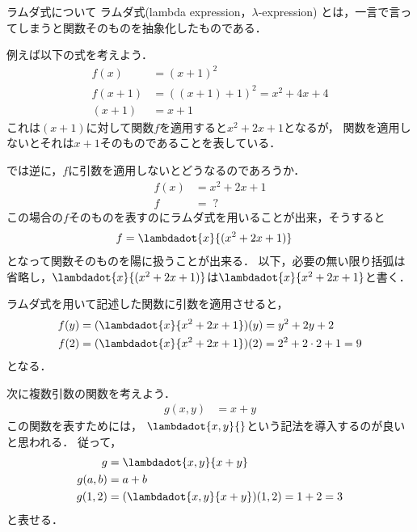 \documentclass[a4paper,titlepage,report]{jsbook}
\begin{document}
\begin{resbonsiblesection}{ラムダ式について}{\sakamoto}\label{sc:about-lambda-expression}
ラムダ式(lambda expression，$\lambda$-expression) とは，一言で言ってしまうと関数そのものを抽象化したものである．

例えば以下の式を考えよう．
\begin{align}
f(x) &= (x + 1)^2\\
f(x + 1) &= {\left((x + 1) + 1\right)}^2 = x^2 + 4x + 4\\
(x + 1) &= x + 1
\end{align}
これは$(x + 1)$に対して関数$f$を適用すると$x^2 + 2x + 1$となるが，
関数を適用しないとそれは$x + 1$そのものであることを表している．

では逆に，$f$に引数を適用しないとどうなるのであろうか．
\begin{align}
f(x) &= x^2 + 2x + 1\\
f    &= \;?
\end{align}
この場合の$f$そのものを表すのにラムダ式を用いることが出来，そうすると
\begin{align}
f &= \lambdadot{x}{(x^2 + 2x + 1)}
\end{align}
となって関数そのものを陽に扱うことが出来る．
以下，必要の無い限り括弧は省略し，$\lambdadot{x}{(x^2 + 2x + 1)}$は$\lambdadot{x}{x^2 + 2x + 1}$と書く．

ラムダ式を用いて記述した関数に引数を適用させると，
\begin{align}
f(y) &= (\lambdadot{x}{x^2 + 2x + 1})(y) = y^2 + 2y + 2 \\
f(2) &= (\lambdadot{x}{x^2 + 2x + 1})(2) = 2^2 + 2\cdot 2 + 1 = 9
\end{align}
となる．

次に複数引数の関数を考えよう．
\begin{align}
g(x, y) &= x + y
\end{align}
この関数を表すためには，
$\lambdadot{x,y}{}$という記法を導入するのが良いと思われる．
従って，
\begin{align}
\label{eq:lambda-multiple}
g &= \lambdadot{x,y}{x + y}\\
\label{eq:lambda-multiple-inst}
g(a, b) &= a + b\\
g(1, 2) &= (\lambdadot{x,y}{x + y})(1, 2) = 1 + 2 = 3
\end{align}
と表せる．


\end{resbonsiblesection}
\end{document}

